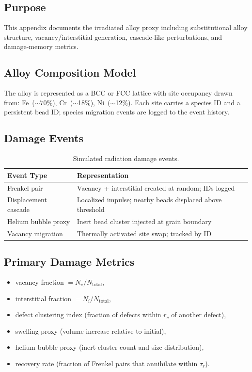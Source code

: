 \documentclass[12pt]{article}
\begin{document}
\subsection{Purpose}

This appendix documents the irradiated alloy proxy including substitutional alloy
structure, vacancy/interstitial generation, cascade-like perturbations, and
damage-memory metrics.

\subsection{Alloy Composition Model}

The alloy is represented as a BCC or FCC lattice with site occupancy drawn from:
Fe~($\sim$70\%), Cr~($\sim$18\%), Ni~($\sim$12\%).
Each site carries a species ID and a persistent bead ID; species migration
events are logged to the event history.

\subsection{Damage Events}

\begin{table}[H]
\centering
\caption{Simulated radiation damage events.}
\label{tab:app_alloy_damage}
\begin{tabular}{p{}p{}}
\toprule
\textbf{Event Type} & \textbf{Representation} \\
\midrule
Frenkel pair         & Vacancy + interstitial created at random; IDs logged \\
Displacement cascade & Localized impulse; nearby beads displaced above threshold \\
Helium bubble proxy  & Inert bead cluster injected at grain boundary \\
Vacancy migration    & Thermally activated site swap; tracked by ID \\
\bottomrule
\end{tabular}
\end{table}

\subsection{Primary Damage Metrics}

\begin{itemize}[noitemsep]
	\item vacancy fraction $= N_v / N_{\text{total}}$,
	\item interstitial fraction $= N_i / N_{\text{total}}$,
	\item defect clustering index (fraction of defects within $r_c$ of another defect),
	\item swelling proxy (volume increase relative to initial),
	\item helium bubble proxy (inert cluster count and size distribution),
	\item recovery rate (fraction of Frenkel pairs that annihilate within $\tau_r$).
\end{itemize}
\end{document}
